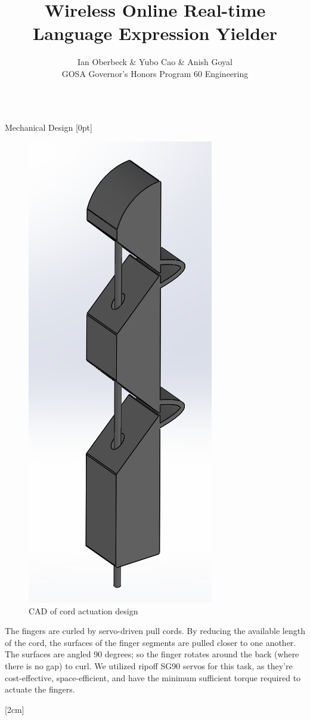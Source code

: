 \documentclass[final, 20pt]{beamer}
\title{Wireless Online Real-time Language Expression Yielder}
\author{Ian Oberbeck \& Yubo Cao \& Anish Goyal \\\normalfont\selectfont GOSA Governor's Honors Program 60 Engineering}
\newlength{\colwidth}
\begin{document}
\begin{frame}[t]
  \centering
  \begin{columns}[t]
    \margincolumn

    \begin{column}{\colwidth}
      \begin{block}{Mechanical Design}
        [0pt]

        \begin{figure}
          \centering
          \includegraphics[width=0.35\linewidth]{images/finger.png}
          \caption{CAD of cord actuation design}
          \label{fig:cord-actuation}
        \end{figure}

        The fingers are curled by servo-driven pull cords. By reducing the available length of the cord, the surfaces of the finger segments are pulled closer to one another. The surfaces are angled 90 degrees; so the finger rotates around the back (where there is no gap) to curl. We utilized ripoff SG90 servos for this task, as they're cost-effective, space-efficient, and have the minimum sufficient torque required to actuate the fingers.

        [2cm]


\end{block}
\end{column}
\end{columns}
\end{frame}
\end{document}
